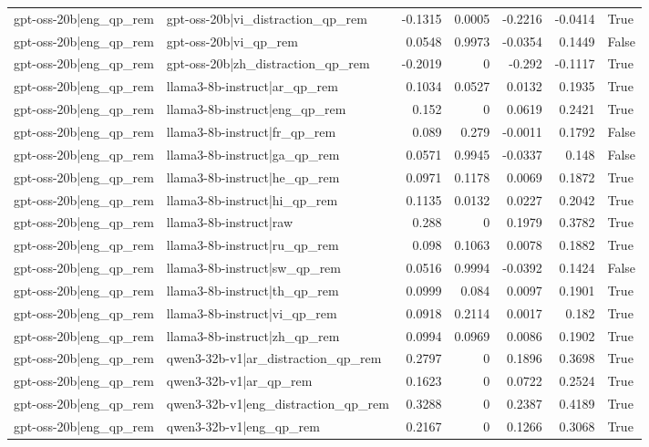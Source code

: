 \begin{table}
\begin{tabular}{l l r r r r l}
gpt-oss-20b|eng_qp_rem & gpt-oss-20b|vi_distraction_qp_rem & -0.1315 & 0.0005 & -0.2216 & -0.0414 & True \\
gpt-oss-20b|eng_qp_rem & gpt-oss-20b|vi_qp_rem & 0.0548 & 0.9973 & -0.0354 & 0.1449 & False \\
gpt-oss-20b|eng_qp_rem & gpt-oss-20b|zh_distraction_qp_rem & -0.2019 & 0 & -0.292 & -0.1117 & True \\
gpt-oss-20b|eng_qp_rem & llama3-8b-instruct|ar_qp_rem & 0.1034 & 0.0527 & 0.0132 & 0.1935 & True \\
gpt-oss-20b|eng_qp_rem & llama3-8b-instruct|eng_qp_rem & 0.152 & 0 & 0.0619 & 0.2421 & True \\
gpt-oss-20b|eng_qp_rem & llama3-8b-instruct|fr_qp_rem & 0.089 & 0.279 & -0.0011 & 0.1792 & False \\
gpt-oss-20b|eng_qp_rem & llama3-8b-instruct|ga_qp_rem & 0.0571 & 0.9945 & -0.0337 & 0.148 & False \\
gpt-oss-20b|eng_qp_rem & llama3-8b-instruct|he_qp_rem & 0.0971 & 0.1178 & 0.0069 & 0.1872 & True \\
gpt-oss-20b|eng_qp_rem & llama3-8b-instruct|hi_qp_rem & 0.1135 & 0.0132 & 0.0227 & 0.2042 & True \\
gpt-oss-20b|eng_qp_rem & llama3-8b-instruct|raw & 0.288 & 0 & 0.1979 & 0.3782 & True \\
gpt-oss-20b|eng_qp_rem & llama3-8b-instruct|ru_qp_rem & 0.098 & 0.1063 & 0.0078 & 0.1882 & True \\
gpt-oss-20b|eng_qp_rem & llama3-8b-instruct|sw_qp_rem & 0.0516 & 0.9994 & -0.0392 & 0.1424 & False \\
gpt-oss-20b|eng_qp_rem & llama3-8b-instruct|th_qp_rem & 0.0999 & 0.084 & 0.0097 & 0.1901 & True \\
gpt-oss-20b|eng_qp_rem & llama3-8b-instruct|vi_qp_rem & 0.0918 & 0.2114 & 0.0017 & 0.182 & True \\
gpt-oss-20b|eng_qp_rem & llama3-8b-instruct|zh_qp_rem & 0.0994 & 0.0969 & 0.0086 & 0.1902 & True \\
gpt-oss-20b|eng_qp_rem & qwen3-32b-v1|ar_distraction_qp_rem & 0.2797 & 0 & 0.1896 & 0.3698 & True \\
gpt-oss-20b|eng_qp_rem & qwen3-32b-v1|ar_qp_rem & 0.1623 & 0 & 0.0722 & 0.2524 & True \\
gpt-oss-20b|eng_qp_rem & qwen3-32b-v1|eng_distraction_qp_rem & 0.3288 & 0 & 0.2387 & 0.4189 & True \\
gpt-oss-20b|eng_qp_rem & qwen3-32b-v1|eng_qp_rem & 0.2167 & 0 & 0.1266 & 0.3068 & True \\

\end{tabular}
\end{table}
